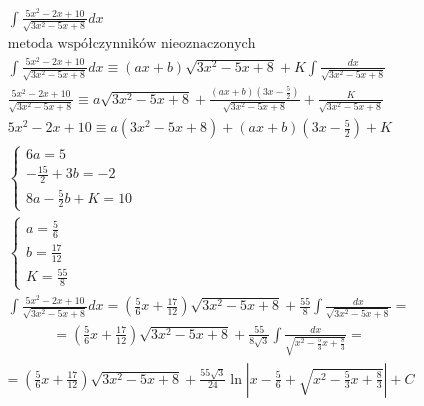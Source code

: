 \begin{gather*}
  \int \frac{5x^2-2x+10}{\sqrt{3x^2-5x+8}}dx \\
  \text{metoda współczynników nieoznaczonych} \\
  \int \frac{5x^2-2x+10}{\sqrt{3x^2-5x+8}}dx \equiv (ax+b)\sqrt{3x^2-5x+8} + K\int \frac{dx}{\sqrt{3x^2-5x+8}} \\
\frac{5x^2-2x+10}{\sqrt{3x^2-5x+8}} \equiv a\sqrt{3x^2-5x+8} + \frac{(ax+b)(3x-\frac{5}{2})}{\sqrt{3x^2-5x+8}} + \frac{K}{\sqrt{3x^2-5x+8}} \\
5x^2-2x+10 \equiv a(3x^2-5x+8) + (ax+b)(3x-\frac{5}{2}) + K \\
\begin{cases} 6a=5 \\ -\frac{15}{2}+3b=-2 \\ 8a-\frac{5}{2}b+K=10 \end{cases} \\
\begin{cases} a=\frac{5}{6} \\ b=\frac{17}{12} \\ K=\frac{55}{8} \end{cases} \\
\int \frac{5x^2-2x+10}{\sqrt{3x^2-5x+8}}dx = (\frac{5}{6}x+\frac{17}{12})\sqrt{3x^2-5x+8} + \frac{55}{8}\int \frac{dx}{\sqrt{3x^2-5x+8}} = \end{gather*}
\begin{gather*}= (\frac{5}{6}x+\frac{17}{12})\sqrt{3x^2-5x+8} + \frac{55}{8\sqrt{3}}\int \frac{dx}{\sqrt{x^2-\frac{5}{3}x+\frac{8}{3}}} = \end{gather*}
\begin{gather*}= (\frac{5}{6}x+\frac{17}{12})\sqrt{3x^2-5x+8} + \frac{55\sqrt{3}}{24}\ln|x-\frac{5}{6}+\sqrt{x^2-\frac{5}{3}x+\frac{8}{3}}|+C\end{gather*}



